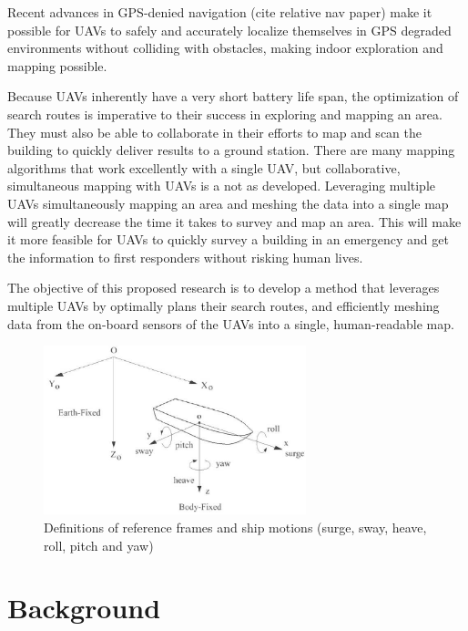 \documentclass[12pt, letterpaper]{article}
\begin{document}
Recent advances in GPS-denied navigation (cite relative nav paper) make it possible for UAVs to safely and accurately localize themselves in GPS degraded environments without colliding with obstacles, making indoor exploration and mapping possible. 

Because UAVs inherently have a very short battery life span, the optimization of search routes is imperative to their success in exploring and mapping an area. They must also be able to collaborate in their efforts to map and scan the building to quickly deliver results to a ground station. There are many mapping algorithms that work excellently with a single UAV, but collaborative, simultaneous mapping with UAVs is a not as developed. Leveraging multiple UAVs simultaneously mapping an area and meshing the data into a single map will greatly decrease the time it takes to survey and map an area. This will make it more feasible for UAVs to quickly survey a building in an emergency and get the information to first responders without risking human lives.

The objective of this proposed research is to develop a method that leverages multiple UAVs by optimally plans their search routes, and efficiently meshing data from the on-board sensors of the UAVs into a single, human-readable map. 

\begin{figure}[h] %
   \centering
   \includegraphics[trim = 0mm 0mm 0mm 0mm,clip,width=3in]{ship_motions.png}
   \caption{Definitions of reference frames and ship motions (surge, sway, heave, roll, pitch and yaw)}
   \label{fig:shipmotions}
\end{figure}

\section{Background}
\end{document}
